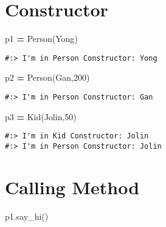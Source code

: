 \documentclass[
]{book}
\newenvironment{Shaded}{\begin{snugshade}}{\end{snugshade}}
\newcommand{\DecValTok}[1]{\textcolor[rgb]{0.06,0.06,0.06}{#1}}
\newcommand{\NormalTok}[1]{#1}
\newcommand{\OperatorTok}[1]{\textcolor[rgb]{0.43,0.43,0.43}{\textbf{#1}}}
\newcommand{\StringTok}[1]{\textcolor[rgb]{0.5,0.5,0.5}{#1}}
\begin{document}
\hypertarget{constructor-2}{%
\section{Constructor}\label{constructor-2}}

\begin{Shaded}
\begin{Highlighting}[]
\NormalTok{p1 }\OperatorTok{=}\NormalTok{ Person(}\StringTok{\textquotesingle{}Yong\textquotesingle{}}\NormalTok{)  }
\end{Highlighting}
\end{Shaded}

\begin{verbatim}
#:> I'm in Person Constructor: Yong
\end{verbatim}

\begin{Shaded}
\begin{Highlighting}[]
\NormalTok{p2 }\OperatorTok{=}\NormalTok{ Person(}\StringTok{\textquotesingle{}Gan\textquotesingle{}}\NormalTok{,}\DecValTok{200}\NormalTok{)}
\end{Highlighting}
\end{Shaded}

\begin{verbatim}
#:> I'm in Person Constructor: Gan
\end{verbatim}

\begin{Shaded}
\begin{Highlighting}[]
\NormalTok{p3 }\OperatorTok{=}\NormalTok{ Kid(}\StringTok{\textquotesingle{}Jolin\textquotesingle{}}\NormalTok{,}\DecValTok{50}\NormalTok{)}
\end{Highlighting}
\end{Shaded}

\begin{verbatim}
#:> I'm in Kid Constructor: Jolin
#:> I'm in Person Constructor: Jolin
\end{verbatim}

\hypertarget{calling-method}{%
\section{Calling Method}\label{calling-method}}

\begin{Shaded}
\begin{Highlighting}[]
\NormalTok{p1.say\_hi()}
\end{Highlighting}
\end{Shaded}
\end{document}

